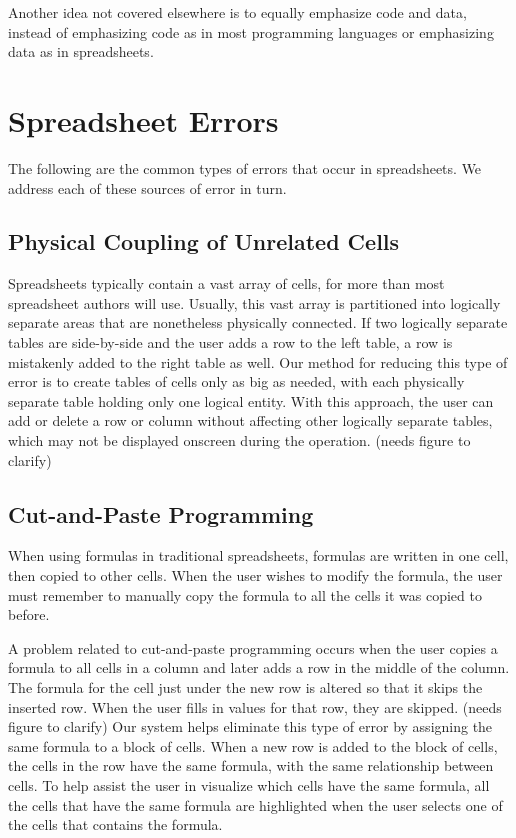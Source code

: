\documentclass{acm_proc_article-sp}
\begin{document}
Another idea not covered elsewhere is to equally emphasize code and
data, instead of emphasizing code as in most programming languages or
emphasizing data as in spreadsheets.

\section{Spreadsheet Errors}
The following are the common types of errors that occur in
spreadsheets.  We address each of these sources of error in turn.

\subsection{Physical Coupling of Unrelated Cells}
Spreadsheets typically contain a vast array of cells, for more than
most spreadsheet authors will use. Usually, this vast array is
partitioned into logically separate areas that are nonetheless
physically connected. If two logically separate tables are
side-by-side and the user adds a row to the left table, a row is
mistakenly added to the right table as well. Our method for reducing
this type of error is to create tables of cells only as big as needed,
with each physically separate table holding only one logical
entity. With this approach, the user can add or delete a row or column
without affecting other logically separate tables, which may not be
displayed onscreen during the operation. (needs figure to clarify)

\subsection{Cut-and-Paste Programming}
When using formulas in traditional spreadsheets, formulas are written
in one cell, then copied to other cells. When the user wishes to
modify the formula, the user must remember to manually copy the
formula to all the cells it was copied to before.

A problem related to cut-and-paste programming occurs when the user
copies a formula to all cells in a column and later adds a row in the
middle of the column. The formula for the cell just under the new row
is altered so that it skips the inserted row. When the user fills in
values for that row, they are skipped. (needs figure to clarify) Our
system helps eliminate this type of error by assigning the same
formula to a block of cells. When a new row is added to the block of
cells, the cells in the row have the same formula, with the same
relationship between cells. To help assist the user in visualize which
cells have the same formula, all the cells that have the same formula
are highlighted when the user selects one of the cells that contains
the formula.
\end{document}
